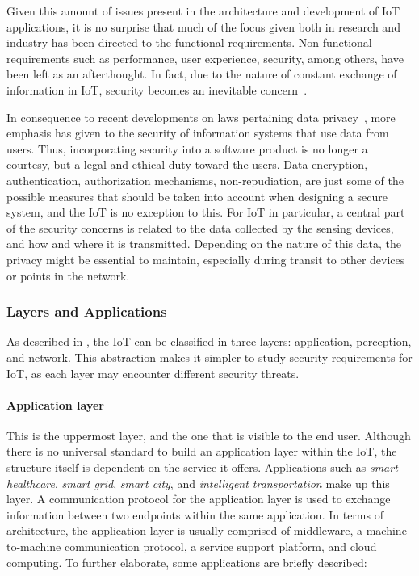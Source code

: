 \documentclass[12pt]{article}
\begin{document}
Given this amount of issues present in the architecture and development of IoT applications, it is no surprise that much of the focus given both in research and industry has been directed to the functional requirements. Non-functional requirements such as performance, user experience, security, among others, have been left as an afterthought. In fact, due to the nature of constant exchange of information in IoT, security becomes an inevitable concern~\cite{Zhang:2015}.

In consequence to recent developments on laws pertaining data privacy~\cite{eu_law}, more emphasis has given to the security of information systems that use data from users. Thus, incorporating security into a software product is no longer a courtesy, but a legal and ethical duty toward the users. Data encryption, authentication, authorization mechanisms, non-repudiation, are just some of the possible measures that should be taken into account when designing a secure system, and the IoT is no exception to this. For IoT in particular, a central part of the security concerns is related to the data collected by the sensing devices, and how and where it is transmitted. Depending on the nature of this data, the privacy might be essential to maintain, especially during transit to other devices or points in the network.

\subsubsection{Layers and Applications}
As described in \cite{ALABA201710}, the IoT can be classified in three layers: application, perception, and network. This abstraction makes it simpler to study security requirements for IoT, as each layer may encounter different security threats. 

\paragraph{Application layer} This is the uppermost layer, and the one that is visible to the end user. Although there is no universal standard to build an application layer within the IoT, the structure itself is dependent on the service it offers. Applications such as \emph{smart healthcare}, \emph{smart grid}, \emph{smart city}, and \emph{intelligent transportation} make up this layer. A communication protocol for the application layer is used to exchange information between two endpoints within the same application. In terms of architecture, the application layer is usually comprised of middleware, a machine-to-machine communication protocol, a service support platform, and cloud computing. To further elaborate, some applications are briefly described:
\end{document}

